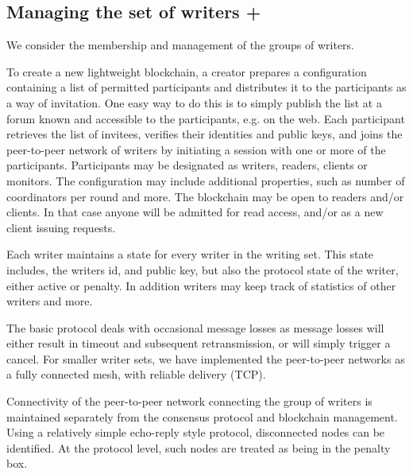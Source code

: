 \documentclass[10pt]{article}
\begin{document}
\subsection{Managing the set of writers +}

We consider the membership and management of the groups of writers. 

To create a new lightweight blockchain, a creator prepares a configuration containing a list of permitted participants and distributes it to the participants as a way of invitation. One easy way to do this is to simply publish the list at a forum known and accessible to the participants, e.g. on the web. Each participant retrieves the list of invitees, verifies their identities and public keys, and joins the peer-to-peer network of writers by initiating a session with one or more of the participants. Participants may be designated as writers, readers, clients or monitors. The configuration may include additional properties, such as number of coordinators per round and more. The blockchain may be open to readers and/or clients. In that case anyone will be admitted for read access, and/or as a new client issuing requests.

Each writer maintains a state for every writer in the writing set. This state includes, the writers id, and public key, but also the protocol state of the writer, either active or penalty. In addition writers may keep track of statistics of other writers and more.

The basic protocol deals with occasional message losses as message losses will either result in timeout and subsequent retransmission, or will simply trigger a cancel. For smaller writer sets, we have implemented the peer-to-peer networks as a fully connected mesh, with reliable delivery (TCP). 

Connectivity of the peer-to-peer network connecting the group of writers is maintained separately from the consensus protocol and blockchain management. Using a relatively simple echo-reply style protocol, disconnected nodes can be %
identified. At the protocol level, such nodes are treated as being in the penalty box.


\end{document}

